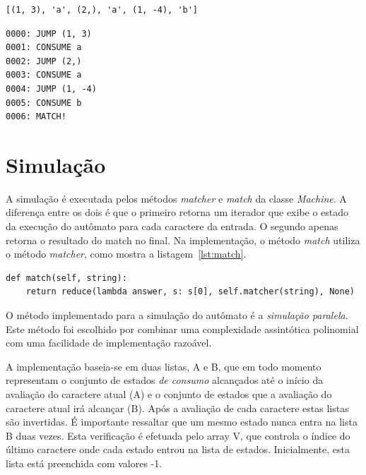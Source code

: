 \documentclass[a4paper,12pt,oneside,onecolumn]{uerj}
\begin{document}
{
  \lstset{%
    basicstyle=\ttfamily\normalsize,
  }
  \begin{lstlisting}[caption={Representação do autômato como array},label=lst:automaton_array]
	[(1, 3), 'a', (2,), 'a', (1, -4), 'b']
  \end{lstlisting}
}

{
  \lstset{%
    basicstyle=\ttfamily\normalsize,
  }
  \begin{lstlisting}[caption={Representação do autômato como instruções},label=lst:automaton_instr]
0000: JUMP (1, 3)
0001: CONSUME a
0002: JUMP (2,)
0003: CONSUME a
0004: JUMP (1, -4)
0005: CONSUME b
0006: MATCH!
  \end{lstlisting}
}


\section{Simulação}

A simulação é executada pelos métodos \emph{matcher} e \emph{match} da classe \emph{Machine}. A diferença entre os dois é que o primeiro retorna um iterador que exibe o estado da execução do autômato para cada caractere da entrada. O segundo apenas retorna o resultado do match no final. Na implementação, o método \emph{match} utiliza o método \emph{matcher}, como mostra a listagem~\ref{lst:match}.

\vspace{0.5cm}
\begin{lstlisting}[caption={Implementação do método \emph{match}},label=lst:match]
def match(self, string):
    return reduce(lambda answer, s: s[0], self.matcher(string), None)
\end{lstlisting}

O método implementado para a simulação do autômato é a \emph{simulação paralela}. Este método foi escolhido por combinar uma complexidade assintótica polinomial com uma facilidade de implementação razoável.

A implementação baseia-se em duas listas, A e B, que em todo momento representam o conjunto de estados \emph{de consumo} alcançados até o início da avaliação do caractere atual (A) e o conjunto de estados que a avaliação do caractere atual irá alcançar (B). Após a avaliação de cada caractere estas listas são invertidas. É importante ressaltar que um mesmo estado nunca entra na lista B duas vezes. Esta verificação é efetuada pelo array V, que controla o índice do último caractere onde cada estado entrou na lista de estados. Inicialmente, esta lista está preenchida com valores -1.
\end{document}
